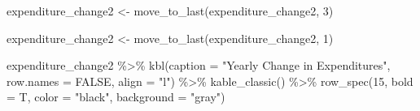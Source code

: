 \documentclass[
  letterpaper,
  DIV=11,
  numbers=noendperiod]{scrreport}
\newenvironment{Shaded}{\begin{snugshade}}{\end{snugshade}}
\newcommand{\AttributeTok}[1]{\textcolor[rgb]{0.40,0.45,0.13}{#1}}
\newcommand{\ConstantTok}[1]{\textcolor[rgb]{0.56,0.35,0.01}{#1}}
\newcommand{\DecValTok}[1]{\textcolor[rgb]{0.68,0.00,0.00}{#1}}
\newcommand{\FunctionTok}[1]{\textcolor[rgb]{0.28,0.35,0.67}{#1}}
\newcommand{\NormalTok}[1]{\textcolor[rgb]{0.00,0.23,0.31}{#1}}
\newcommand{\OtherTok}[1]{\textcolor[rgb]{0.00,0.23,0.31}{#1}}
\newcommand{\SpecialCharTok}[1]{\textcolor[rgb]{0.37,0.37,0.37}{#1}}
\newcommand{\StringTok}[1]{\textcolor[rgb]{0.13,0.47,0.30}{#1}}
\begin{document}
\begin{Shaded}
\begin{Highlighting}[]
\NormalTok{expenditure\_change2 }\OtherTok{\textless{}{-}} \FunctionTok{move\_to\_last}\NormalTok{(expenditure\_change2, }\DecValTok{3}\NormalTok{) }

\NormalTok{expenditure\_change2 }\OtherTok{\textless{}{-}} \FunctionTok{move\_to\_last}\NormalTok{(expenditure\_change2, }\DecValTok{1}\NormalTok{)}

\NormalTok{expenditure\_change2 }\SpecialCharTok{\%\textgreater{}\%} 
  \FunctionTok{kbl}\NormalTok{(}\AttributeTok{caption =} \StringTok{"Yearly Change in Expenditures"}\NormalTok{, }\AttributeTok{row.names =} \ConstantTok{FALSE}\NormalTok{, }\AttributeTok{align =} \StringTok{"l"}\NormalTok{) }\SpecialCharTok{\%\textgreater{}\%} 
  \FunctionTok{kable\_classic}\NormalTok{() }\SpecialCharTok{\%\textgreater{}\%}
    \FunctionTok{row\_spec}\NormalTok{(}\DecValTok{15}\NormalTok{, }\AttributeTok{bold =}\NormalTok{ T, }\AttributeTok{color =} \StringTok{"black"}\NormalTok{, }\AttributeTok{background =} \StringTok{"gray"}\NormalTok{)}
\end{Highlighting}
\end{Shaded}
\end{document}
